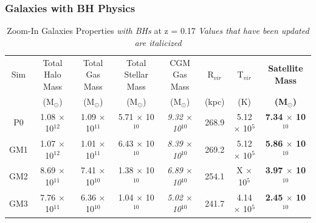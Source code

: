 \documentclass[]{emulateapj}
\begin{document}
\subsubsection{Galaxies with BH Physics} 

\begin{table}[ht!] %
\caption{Zoom-In Galaxies Properties \textit{with BHs} at z = 0.17 \textit{Values that have been updated are italicized}} %
\centering %
\begin{tabular}{c c c c c c c c} %
\hline\hline %
Sim & Total Halo Mass  & Total Gas Mass & Total Stellar Mass & CGM Gas Mass & R$_{vir}$ & T$_{vir}$ & \textbf{Satellite Mass}\\
 & (M$_{\odot}$) & (M$_{\odot}$) & (M$_{\odot}$) & (M$_{\odot}$) & (kpc) & (K) & \textbf{(M$_{\odot}$)} \\ [0.5ex] %
\hline %
P0 & 1.08 $\times$ 10$^{12}$ & 1.09 $\times$ 10$^{11}$ & 5.71 $\times$ 10$^{10}$ & \textit{9.32 $\times$ 10$^{10}$} & 268.9 & 5.12 $\times$ 10$^5$ & \textbf{7.34 $\times$ 10$^{10}$}\\ %
GM1 & 1.07 $\times$ 10$^{12}$ & 1.01 $\times$ 10$^{11}$ & 6.43 $\times$ 10$^{10}$ & \textit{8.39 $\times$ 10$^{10}$} & 269.2 & 5.12 $\times$ 10$^5$ & \textbf{5.86 $\times$ 10$^{10}$}\\
GM2 & 8.69 $\times$ 10$^{11}$ & 7.41 $\times$ 10$^{10}$ & 1.38 $\times$ 10$^{10}$ & \textit{6.89 $\times$ 10$^{10}$} & 254.1 & X $\times$ 10$^5$ & \textbf{3.97 $\times$ 10$^{10}$}  \\ %
GM3 & 7.76 $\times$ 10$^{11}$ & 6.36 $\times$ 10$^{10}$ & 1.04 $\times$ 10$^{10}$ & \textit{5.02 $\times$ 10$^{10}$} & 241.7 & 4.14 $\times$ 10$^5$ & \textbf{2.45 $\times$ 10$^{10}$} \\ [1ex] %
\hline %
\end{tabular}
\label{table:BHdata} %



\end{table}
\end{document}
